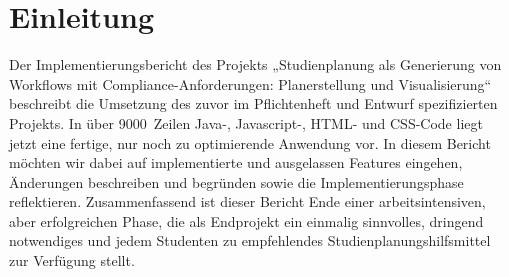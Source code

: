 \section{Einleitung}
Der Implementierungsbericht des Projekts „Studienplanung als Generierung von Workflows mit Compliance-Anforderungen: Planerstellung und Visualisierung“ beschreibt die Umsetzung des zuvor im Pflichtenheft und Entwurf spezifizierten Projekts. In über 9000~Zeilen Java-, Javascript-, HTML- und CSS-Code liegt jetzt eine fertige, nur noch zu optimierende Anwendung vor. In diesem Bericht möchten wir dabei auf implementierte und ausgelassen Features eingehen, Änderungen beschreiben und begründen sowie die Implementierungsphase  reflektieren.
Zusammenfassend ist dieser Bericht Ende einer arbeitsintensiven, aber erfolgreichen Phase, die als Endprojekt ein einmalig sinnvolles, dringend notwendiges und jedem Studenten zu empfehlendes Studienplanungshilfsmittel zur Verfügung stellt.


